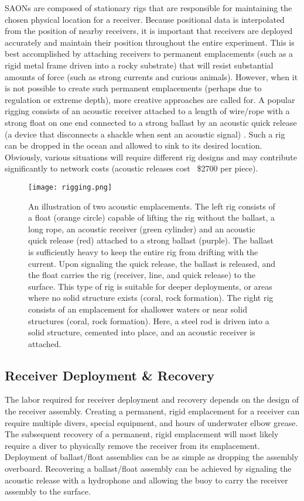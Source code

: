 SAONs are composed of stationary rigs that are responsible for maintaining the chosen physical location for a receiver.  Because positional data is interpolated from the position of nearby receivers, it is important that receivers are deployed accurately and maintain their position throughout the entire experiment\cite{Heupel2006}.  This is best accomplished by attaching receivers to permanent emplacements  (such as a rigid metal frame driven into a rocky substrate) that will resist substantial amounts of force (such as strong currents and curious animals).  However, when it is not possible to create such permanent emplacements (perhaps due to regulation or extreme depth), more creative approaches are called for.  A popular rigging consists of an acoustic receiver attached to a length of wire/rope with a strong float on one end connected to a strong ballast by an acoustic quick release (a device that disconnects a shackle when sent an acoustic signal) \cite{Heupel2006}.  Such a rig can be dropped in the ocean and allowed to sink to its desired location.  Obviously, various situations will require different rig designs and may contribute significantly to network costs (acoustic releases cost ~\$2700 per piece).


\begin{figure}[ht]
	\label{rigging}
	\centering
	\texttt{[image: rigging.png]}
	\caption{An illustration of two acoustic emplacements.  The left rig consists of a float (orange circle) capable of lifting the rig without the ballast, a long rope, an acoustic receiver (green cylinder) and an acoustic quick release (red) attached to a strong ballast (purple).  The ballast is sufficiently heavy to keep the entire rig from drifting with the current.  Upon signaling the quick release, the ballast is released, and the float carries the rig (receiver, line,  and quick release) to the surface.  This type of rig is suitable for deeper deployments, or areas where no solid structure exists (coral, rock formation).   The right rig consists of an emplacement for shallower waters or near solid structures (coral, rock formation).  Here, a steel rod is driven into a solid structure, cemented into place, and an acoustic receiver is attached. }
\end{figure}

\subsection{Receiver Deployment \& Recovery}
The labor required for receiver deployment and recovery depends on the design of the receiver assembly.  Creating a permanent, rigid emplacement for a receiver can require multiple divers, special equipment,  and hours of underwater elbow grease.  The subsequent recovery of a permanent, rigid emplacement will most likely require a diver to physically remove the receiver from its emplacement. Deployment of ballast/float assemblies can be as simple as dropping the assembly overboard.  Recovering a ballast/float assembly can be achieved by signaling the acoustic release with a hydrophone and allowing the buoy to carry the receiver assembly to the surface.

